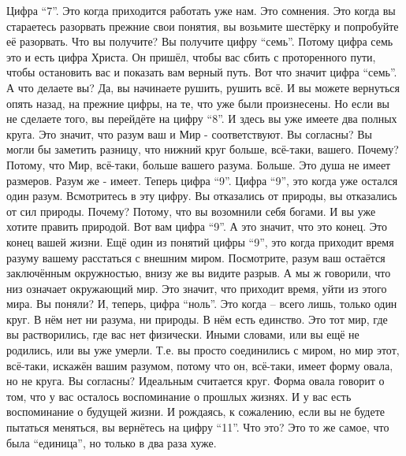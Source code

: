   Цифра ``7''.  Это когда приходится работать уже нам. Это сомнения. Это когда вы стараетесь разорвать прежние свои понятия, вы возьмите шестёрку и попробуйте её разорвать. Что вы получите? Вы получите цифру ``семь''. Потому цифра семь это и есть цифра Христа. Он пришёл, чтобы вас сбить с проторенного пути, чтобы остановить  вас и показать вам верный путь. Вот что значит цифра ``семь''. А что делаете вы? Да, вы начинаете рушить, рушить всё.  И вы можете вернуться опять назад, на прежние цифры, на те, что уже были произнесены. Но если вы не сделаете того, вы перейдёте на цифру ``8''. И здесь вы уже имеете два полных круга. Это значит, что разум ваш и Мир - соответствуют. Вы согласны? Вы могли бы заметить  разницу, что нижний круг больше, всё-таки, вашего. Почему? Потому, что Мир, всё-таки, больше вашего разума. Больше. Это душа не имеет размеров. Разум же - имеет. 
  Теперь цифра ``9''. Цифра ``9'', это когда уже остался один разум. Всмотритесь в эту цифру. Вы отказались от природы, вы отказались от сил природы. Почему? Потому, что вы возомнили себя богами. И вы уже хотите править природой. Вот вам цифра ``9''. А это значит, что это конец. Это конец вашей жизни. Ещё один из понятий цифры ``9'', это когда приходит время разуму вашему расстаться  с внешним миром. Посмотрите, разум ваш остаётся заключённым окружностью, внизу же вы видите разрыв. А мы ж говорили, что низ означает окружающий мир. Это значит, что приходит время, уйти из этого мира. Вы поняли? И, теперь, цифра ``ноль''. Это когда – всего лишь, только один круг. В нём нет ни разума, ни природы. В нём есть единство. Это тот мир, где вы растворились, где вас нет физически. Иными словами, или вы ещё не родились, или вы уже умерли. Т.е. вы просто соединились с миром, но мир этот, всё-таки, искажён вашим разумом, потому что он, всё-таки, имеет форму овала, но не круга. Вы согласны? Идеальным считается круг. Форма овала говорит о том, что у вас осталось воспоминание о прошлых жизнях. И у вас есть воспоминание о будущей жизни. И рождаясь, к сожалению, если вы не будете пытаться меняться, вы вернётесь на цифру ``11''. Что это? Это то же самое, что была ``единица'', но только в два раза хуже. 
